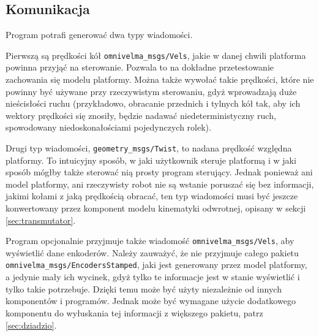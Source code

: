 	\subsection{Komunikacja}
		Program potrafi generować dwa typy wiadomości.
		
		Pierwszą są prędkości kół \texttt{omnivelma\_msgs/Vels}, jakie w danej chwili platforma powinna przyjąć na sterowanie.
		Pozwala to na dokładne przetestowanie zachowania się modelu platformy.
		Można także wywołać takie prędkości, które nie powinny być używane przy rzeczywistym sterowaniu, gdyż wprowadzają duże nieścisłości ruchu 
		(przykładowo, obracanie przednich i tylnych kół tak, aby ich wektory prędkości się znosiły, będzie nadawać niedeterministyczny ruch, spowodowany niedoskonałościami
		pojedynczych rolek).
		
		Drugi typ wiadomości, \texttt{geometry\_msgs/Twist}, to nadana prędkość względna platformy.
		To intuicyjny sposób, w jaki użytkownik steruje platformą i w jaki sposób mógłby także sterować nią prosty program sterujący.
		Jednak ponieważ ani model platformy, ani rzeczywisty robot nie są wstanie poruszać się bez informacji, jakimi kołami z jaką prędkością obracać,
		ten typ wiadomości musi być jeszcze konwertowany przez komponent modelu kinematyki odwrotnej, opisany w sekcji \ref{sec:transmutator}.
		
		Program opcjonalnie przyjmuje także wiadomość \texttt{omnivelma\_msgs/Vels}, aby wyświetlić dane enkoderów.
		Należy zauważyć, że nie przyjmuje całego pakietu \texttt{omnivelma\_msgs/EncodersStamped}, jaki jest generowany przez model platformy,
		a jedynie mały ich wycinek, gdyż tylko te informacje jest w stanie wyświetlić i tylko takie potrzebuje.
		Dzięki temu może być użyty niezależnie od innych komponentów i programów. Jednak może być wymagane użycie dodatkowego komponentu do 
		wyłuskania tej informacji z większego pakietu,
		patrz \ref{sec:dziadzio}.
		

